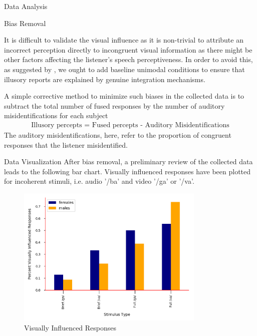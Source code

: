 \documentclass{article}
\begin{document}
\begin{psection}{Data Analysis}

	\begin{psubsection}{Bias Removal}

		It is difficult to validate the visual influence as it is non-trivial to attribute an incorrect perception directly to incongruent visual information as there might be other factors affecting the listener's speech perceptiveness. In order to avoid this, as suggested by \cite{40-years}, we ought to add baseline unimodal conditions to ensure that illusory reports are explained by genuine integration mechanisms.

		A simple corrective method to minimize such biases in the collected data is to subtract the total number of fused responses by the number of auditory misidentifications for each subject \ie
		\begin{align*}
			\text{Illusory percepts = Fused percepts - Auditory Misidentifications}
		\end{align*}
		The auditory misidentifications, here, refer to the proportion of congruent responses that the listener misidentified.

	\end{psubsection}

	\begin{psubsection}{Data Visualization}
		After bias removal, a preliminary review of the collected data leads to the following bar chart. Visually influenced responses have been plotted for incoherent stimuli, i.e. audio '/ba' and video '/ga' or '/va'.

		\begin{figure}[H]
			\centering
			\includegraphics[width=0.8\textwidth]{includes/barchart.png}
			\caption{Visually Influenced Responses}
		\end{figure}


\end{psubsection}
\end{psection}
\end{document}
